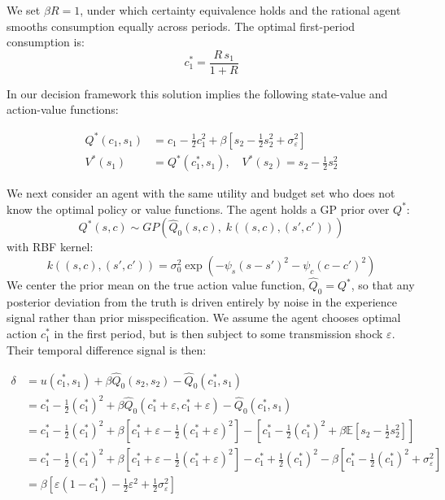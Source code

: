 We set $\beta R = 1$, under which certainty equivalence holds and the rational agent smooths consumption
equally across periods. The optimal first-period consumption is:
\begin{equation}
    c_1^* = \frac{R \, s_1}{1 + R}
\end{equation}

In our decision framework this solution implies the following state-value and action-value functions:

\begin{align*}
    Q^*(c_1, s_1) &= c_1 - \frac{1}{2}c_1^2 + \beta \left[s_2 - \frac{1}{2}s_2^2 + \sigma_\varepsilon^2\right] \\
    V^*(s_1) &= Q^*(c_1^*, s_1), \quad V^*(s_2) = s_2 - \frac{1}{2}s_2^2
\end{align*}

We next consider an agent with the same utility and budget set who does not know the optimal policy or
value functions. The agent holds a GP prior over
$Q^*$:
\begin{equation}
  Q^*(s,c) \sim GP\left(
    \hat{Q}_0(s,c), \;
    k\left((s,c),(s',c')\right)
  \right)
\end{equation}
with RBF kernel:
\begin{equation}
  k\left((s,c),(s',c')\right) = \sigma_0^2
    \exp\left(
      -\psi_s(s - s')^2 - \psi_c(c - c')^2
    \right)
\end{equation}
We center the prior mean on the true action value function, $\hat{Q}_0 = Q^*$, so that any posterior
deviation from the truth is driven entirely by noise in the experience signal rather than prior
misspecification. We assume the agent chooses optimal action $c_1^*$ in the first period, 
but is then subject to some transmission shock $\varepsilon$. Their temporal difference 
signal is then:

\begin{align*}
    \delta &= u(c_1^*, s_1) + \beta \hat{Q}_0(s_2, s_2) - \hat{Q}_0(c_1^*, s_1) \\
    &= c_1^* - \tfrac{1}{2}(c_1^*)^2 + \beta \hat{Q}_0(c_1^* + \varepsilon, c_1^* + \varepsilon) - \hat{Q}_0(c_1^*, s_1) \\
    &= c_1^* - \tfrac{1}{2}(c_1^*)^2 + \beta \left[c_1^* + \varepsilon - \tfrac{1}{2}(c_1^* + \varepsilon)^2\right] - \left[c_1^* - \tfrac{1}{2}(c_1^*)^2 + \beta \mathbb{E}\left[s_2 - \tfrac{1}{2}s_2^2\right]\right] \\
    &= c_1^* - \tfrac{1}{2}(c_1^*)^2 + \beta \left[c_1^* + \varepsilon - \tfrac{1}{2}(c_1^* + \varepsilon)^2\right] - c_1^* + \tfrac{1}{2}(c_1^*)^2 - \beta \left[c_1^* - \tfrac{1}{2}(c_1^*)^2 + \sigma_\varepsilon^2\right] \\
    &= \beta \left[\varepsilon (1 - c_1^*) - \tfrac{1}{2}\varepsilon^2 + \tfrac{1}{2}\sigma_\varepsilon^2\right]
\end{align*}

